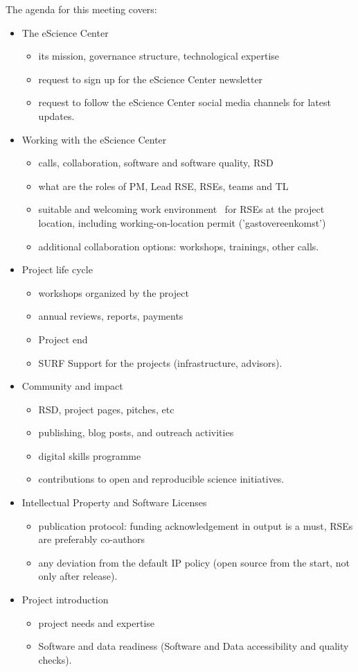 The agenda for this meeting covers:
\begin{itemize}
\item The eScience Center
\begin{itemize}
\item its mission, governance structure, technological expertise
\item request to sign up for the eScience Center newsletter
\item request to follow the eScience Center social media channels for latest updates.
\end{itemize}
\item Working with the eScience Center
\begin{itemize}
\item calls, collaboration, software and software quality, RSD
\item what are the roles of PM, Lead RSE, RSEs, teams and TL
\item suitable and welcoming work environment~\cite{arbo} for RSEs at the project location, including
working-on-location permit ('gastovereenkomst')
\item additional collaboration options: workshops, trainings, other calls.
\end{itemize}
\item Project life cycle
\begin{itemize}
\item workshops organized by the project
\item annual reviews, reports, payments
\item Project end
\item SURF Support for the projects (infrastructure, advisors).
\end{itemize}
\item Community and impact
\begin{itemize}
\item RSD, project pages, pitches, etc
\item publishing, blog posts, and outreach activities
\item digital skills programme
\item contributions to open and reproducible science initiatives.
\end{itemize}
\item Intellectual Property and Software Licenses
\begin{itemize}
\item publication protocol: funding acknowledgement in output is a must, RSEs are preferably co-authors
\item any deviation from the default IP policy (open source from the start, not only after release).
\end{itemize}
\item Project introduction
\begin{itemize}
\item project needs and expertise
\item Software and data readiness (Software and Data accessibility and quality checks).
\end{itemize}
\end{itemize}

